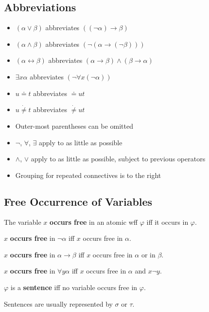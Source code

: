 \subsection{Abbreviations}

\begin{itemize}
    \item $(\alpha\vee\beta)$ abbreviates $((\neg\alpha)\to\beta)$
    \item $(\alpha\wedge\beta)$ abbreviates $(\neg(\alpha \to (\neg\beta)))$
    \item $(\alpha\leftrightarrow\beta)$ abbreviates $(\alpha\to\beta)\wedge(\beta\to\alpha)$
    \item $\exists x\alpha$ abbreviates $(\neg\forall x(\neg\alpha))$
    \item $u\doteq t$ abbreviates $\doteq ut$
    \item $u \dot{\neq} t$ abbreviates $\dot{\neq} ut$
    \item Outer-most parentheses can be omitted
    \item $\neg$, $\forall$, $\exists$ apply to as little as possible
    \item $\wedge$, $\vee$ apply to as little as possible, subject to previous operators
    \item Grouping for repeated connectives is to the right
\end{itemize}

\subsection{Free Occurrence of Variables}

\begin{definition}
    The variable $x$ \textbf{occurs free} in an atomic wff $\varphi$ iff it occurs in $\varphi$.

    $x$ \textbf{occurs free} in $\neg\alpha$ iff $x$ occurs free in $\alpha$.

    $x$ \textbf{occurs free} in $\alpha\to\beta$ iff $x$ occurs free in $\alpha$ or in $\beta$.

    $x$ \textbf{occurs free} in $\forall y \alpha$ iff $x$ occurs free in $\alpha$ and $x \neg y$.
\end{definition}

\begin{definition}[Sentence]
    $\varphi$ is a \textbf{sentence} iff no variable occurs free in $\varphi$.
\end{definition}
\begin{remark}
    Sentences are usually represented by $\sigma$ or $\tau$.
\end{remark}

